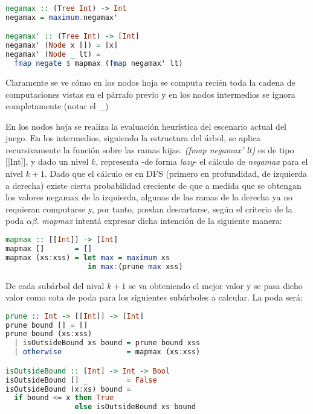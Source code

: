 \documentclass{llncs}
\begin{document}
\begin{lstlisting}[frame=single, language=haskell, captionpos=b, caption=Definiciones de negamax]
negamax :: (Tree Int) -> Int
negamax = maximum.negamax'

negamax' :: (Tree Int) -> [Int]
negamax' (Node x []) = [x]
negamax' (Node _ lt) =
  fmap negate $ mapmax (fmap negamax' lt)
\end{lstlisting}

Claramente se ve cómo en los nodos hoja se computa recién toda la cadena de computaciones vistas en el párrafo previo y  en los nodos intermedios se ignora completamente (notar el \_)

En los nodos hoja se realiza la evaluación heurística del escenario actual del juego. En los intermedios, siguiendo la estructura del árbol, se aplica recursivamente la función sobre las ramas hijas. \textit{(fmap negamax' lt)} es de tipo [[Int]], y dado un nivel $k$, representa -de forma \textit{lazy}-  el cálculo de \textit{negamax} para el nivel $k+1$. Dado que el cálculo es en DFS (primero en profundidad, de izquierda a derecha) existe cierta probabilidad creciente de que a medida que se obtengan los valores negamax de la izquierda, algunas de las ramas de la derecha ya no requieran computarse y, por tanto, puedan descartarse, según el criterio de la poda $\alpha\beta$. \textit{mapmax} intentá expresar dicha intención de la siguiente manera:

\begin{lstlisting}[frame=single, language=haskell, captionpos=b, caption=Definición de mapmax]
mapmax :: [[Int]] -> [Int]
mapmax []       = []
mapmax (xs:xss) = let max = maximum xs
                   in max:(prune max xss)
\end{lstlisting}

De cada subárbol del nival $k+1$ se va obteniendo el mejor valor y se pasa dicho valor como cota de poda para los siguientes subárboles a calcular. La poda será:

\begin{lstlisting}[frame=single, language=haskell, captionpos=b, caption=Definición de prune]
prune :: Int -> [[Int]] -> [Int]
prune bound [] = []
prune bound (xs:xss)
  | isOutsideBound xs bound = prune bound xss
  | otherwise               = mapmax (xs:xss)

isOutsideBound :: [Int] -> Int -> Bool
isOutsideBound [] _         = False
isOutsideBound (x:xs) bound =
  if bound <= x then True
                else isOutsideBound xs bound
\end{lstlisting}
\end{document}
